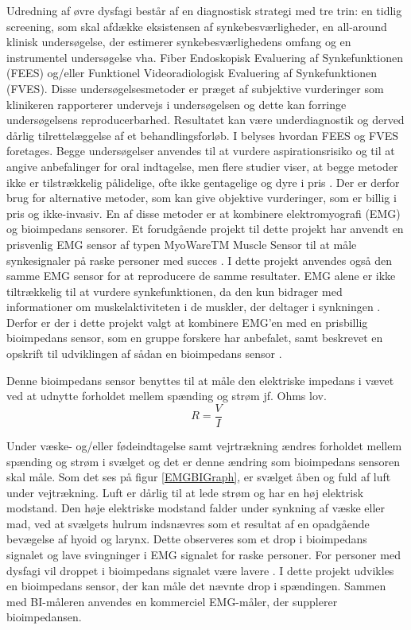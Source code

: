 Udredning af øvre dysfagi består af en diagnostisk strategi med tre trin: en tidlig screening, som skal afdække eksistensen af synkebesværligheder, en all-around klinisk undersøgelse, der estimerer synkebesværlighedens omfang og en instrumentel undersøgelse vha. Fiber Endoskopisk Evaluering af Synkefunktionen (FEES) og/eller Funktionel Videoradiologisk Evaluering af Synkefunktionen (FVES). Disse undersøgelsesmetoder er præget af subjektive vurderinger som klinikeren rapporterer undervejs i undersøgelsen og dette kan forringe undersøgelsens reproducerbarhed.
 Resultatet kan være underdiagnostik og derved dårlig tilrettelæggelse af et behandlingsforløb. I  belyses hvordan FEES og FVES foretages. Begge undersøgelser anvendes til at vurdere aspirationsrisiko og til at angive anbefalinger for oral indtagelse, men flere studier viser, at begge metoder ikke er tilstrækkelig pålidelige, ofte ikke gentagelige og dyre i pris \cite{Kelly2006} \cite{McCullough2001} \cite{Schultheiss2014} \cite{Nahrstaedt2012a}.  Der er derfor brug for alternative metoder, som kan give objektive vurderinger, som er billig i pris og ikke-invasiv. En af disse metoder er at kombinere elektromyografi (EMG) og bioimpedans sensorer. Et forudgående projekt til dette projekt har anvendt en prisvenlig EMG sensor af typen MyoWareTM Muscle Sensor til at måle synkesignaler på raske personer med succes \cite [s. 58] {ChristensenElisabeth;LundbakStrand2017}. I dette projekt anvendes også den samme EMG sensor for at reproducere de samme resultater. EMG alene er ikke tiltrækkelig til at vurdere synkefunktionen, da den kun bidrager med informationer om muskelaktiviteten i de muskler, der deltager i synkningen \cite{Schultheiss2014}. Derfor er der i dette projekt valgt at kombinere EMG'en med en prisbillig bioimpedans sensor, som en gruppe forskere har anbefalet, samt beskrevet en opskrift til udviklingen af sådan en bioimpedans sensor \cite{Aroom2009}.

Denne bioimpedans sensor benyttes til at måle den elektriske impedans i vævet ved at udnytte forholdet mellem spænding og strøm jf. Ohms lov. \\
$$ R= \dfrac{V}{I} $$

Under væske- og/eller fødeindtagelse samt vejrtrækning ændres forholdet mellem spænding og strøm i svælget og det er denne ændring som bioimpedans sensoren skal måle. Som det ses på figur \ref{EMGBIGraph}, er svælget åben og fuld af luft under vejtrækning. Luft er dårlig til at lede strøm og har en høj elektrisk modstand. Den høje elektriske modstand falder under synkning af væske eller mad, ved at svælgets hulrum indsnævres som et resultat af en opadgående bevægelse af hyoid og larynx. Dette observeres som et drop i bioimpedans signalet og lave svingninger i EMG signalet for raske personer. For personer med dysfagi vil droppet i bioimpedans signalet være lavere  \cite{Schultheiss2014}. I dette projekt udvikles en bioimpedans sensor, der kan måle det nævnte drop i spændingen. Sammen med BI-måleren anvendes en kommerciel EMG-måler, der supplerer bioimpedansen. 



